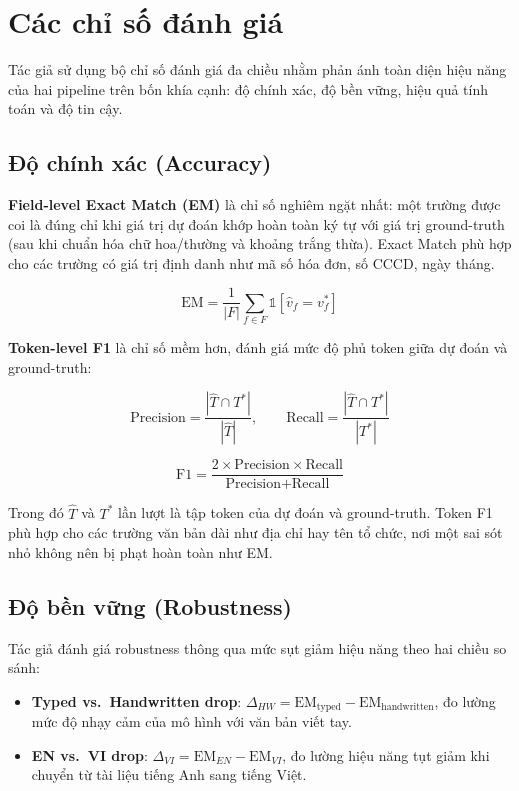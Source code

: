 ﻿\documentclass[12pt]{report}
\begin{document}
\section{Các chỉ số đánh giá}\label{sec:metrics}

Tác giả sử dụng bộ chỉ số đánh giá đa chiều nhằm phản ánh toàn diện hiệu năng của hai pipeline trên bốn khía cạnh: độ chính xác, độ bền vững, hiệu quả tính toán và độ tin cậy.

\subsection{Độ chính xác (Accuracy)}\label{sec:accuracy}

\textbf{Field-level Exact Match (EM)} là chỉ số nghiêm ngặt nhất: một trường được coi là đúng chỉ khi giá trị dự đoán khớp hoàn toàn ký tự với giá trị ground-truth (sau khi chuẩn hóa chữ hoa/thường và khoảng trắng thừa). Exact Match phù hợp cho các trường có giá trị định danh như mã số hóa đơn, số CCCD, ngày tháng.

\begin{equation}
    \text{EM} = \frac{1}{|F|} \sum_{f \in F} \mathbb{1}[\hat{v}_f = v_f^*]
\end{equation}

\textbf{Token-level F1} là chỉ số mềm hơn, đánh giá mức độ phủ token giữa dự đoán và ground-truth:

\[
\text{Precision} = \frac{|\hat{T} \cap T^*|}{|\hat{T}|}, \qquad \text{Recall} = \frac{|\hat{T} \cap T^*|}{|T^*|}
\]

\[
\text{F1} = \frac{2 \times \text{Precision} \times \text{Recall}}{\text{Precision} + \text{Recall}}
\]

Trong đó $\hat{T}$ và $T^*$ lần lượt là tập token của dự đoán và ground-truth. Token F1 phù hợp cho các trường văn bản dài như địa chỉ hay tên tổ chức, nơi một sai sót nhỏ không nên bị phạt hoàn toàn như EM.

\subsection{Độ bền vững (Robustness)}\label{sec:robustness}

Tác giả đánh giá robustness thông qua mức sụt giảm hiệu năng theo hai chiều so sánh:

\begin{itemize}
    \item \textbf{Typed vs.\ Handwritten drop}: $\Delta_{HW} = \text{EM}_{\text{typed}} - \text{EM}_{\text{handwritten}}$, đo lường mức độ nhạy cảm của mô hình với văn bản viết tay.
    \item \textbf{EN vs.\ VI drop}: $\Delta_{VI} = \text{EM}_{EN} - \text{EM}_{VI}$, đo lường hiệu năng tụt giảm khi chuyển từ tài liệu tiếng Anh sang tiếng Việt.
\end{itemize}
\end{document}
